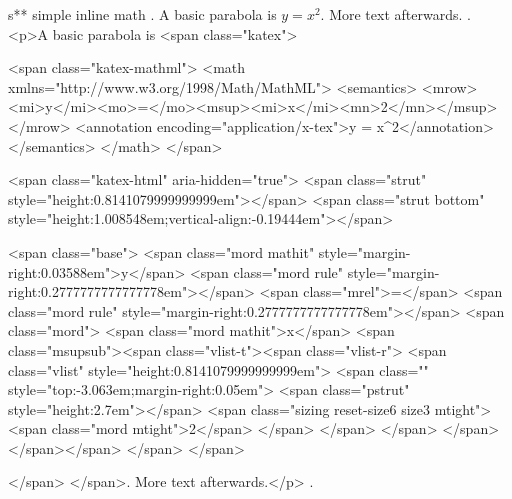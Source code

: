 s** simple inline math
.
A basic parabola is $y = x^2$. More text afterwards.
.
<p>A basic parabola is <span class="katex">

<span class="katex-mathml">
<math xmlns="http://www.w3.org/1998/Math/MathML">
<semantics>
<mrow><mi>y</mi><mo>=</mo><msup><mi>x</mi><mn>2</mn></msup></mrow>
<annotation encoding="application/x-tex">y = x^2</annotation>
</semantics>
</math>
</span>

<span class="katex-html" aria-hidden="true">
<span class="strut" style="height:0.8141079999999999em"></span>
<span class="strut bottom" style="height:1.008548em;vertical-align:-0.19444em"></span>

<span class="base">
<span class="mord mathit" style="margin-right:0.03588em">y</span>
<span class="mord rule" style="margin-right:0.2777777777777778em"></span>
<span class="mrel">=</span>
<span class="mord rule" style="margin-right:0.2777777777777778em"></span>
<span class="mord">
<span class="mord mathit">x</span>
<span class="msupsub"><span class="vlist-t"><span class="vlist-r">
<span class="vlist" style="height:0.8141079999999999em">
<span class="" style="top:-3.063em;margin-right:0.05em">
<span class="pstrut" style="height:2.7em"></span>
<span class="sizing reset-size6 size3 mtight">
<span class="mord mtight">2</span>
</span>
</span>
</span>
</span></span></span>
</span>
</span>

</span>
</span>. More text afterwards.</p>
.
